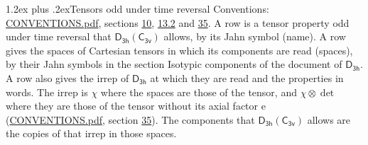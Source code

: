 \documentclass[10pt,a4paper]{article}
\makeatletter
\renewcommand\section{\@startsection{section}{1}{\z@}{-3ex plus -1ex minus -.2ex}%
  {1.2ex plus .2ex}{\normalfont\large\sffamily\bfseries\color{parttitle}}}
\numberwithin{equation}{section}
\newcommand{\grp}[1]{\mathsf{#1}}
\newcommand{\irrprod}{\otimes}
\makeatother
\begin{document}
\section{Tensors odd under time reversal}\label{s:time_odd}
Conventions: \href{../../CONVENTIONS.pdf}{CONVENTIONS.pdf}, sections \href{../../../rotation/CONVENTIONS.pdf\#conv.10}{10}, \href{../../../rotation/CONVENTIONS.pdf\#conv.13.2}{13.2} and \href{../../CONVENTIONS.pdf\#conv.35}{35}.
\leavevmode\label{n:head.name.property}A row is a tensor property odd under time reversal that $\grp{D_{3h}}(\grp{C_{3v}})$ allows, by its Jahn symbol (name). \label{n:head.spaces}A row gives the spaces of Cartesian tensors in which its components are read (spaces), by their Jahn symbols in the section Isotypic components of the document of \href{../../../rotation/data/pdf/D3h.pdf}{$\grp{D_{3h}}$}. \label{n:head.properties}A row also gives the irrep of $\grp{D_{3h}}$ at which they are read and the properties in words. The irrep is $\chi$ where the spaces are those of the tensor, and $\chi \irrprod \det$ where they are those of the tensor without its axial factor e (\href{../../CONVENTIONS.pdf}{CONVENTIONS.pdf}, section \href{../../CONVENTIONS.pdf\#conv.35}{35}). The components that $\grp{D_{3h}}(\grp{C_{3v}})$ allows are the copies of that irrep in those spaces.
\end{document}
